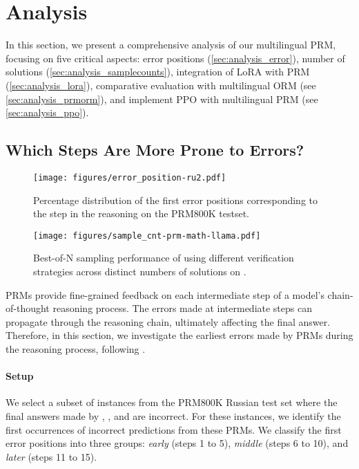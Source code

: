 \section{Analysis}
\label{sec:analysis}


In this section, we present a comprehensive analysis of our multilingual PRM, focusing on five critical aspects: error positions (\autoref{sec:analysis_error}), number of solutions (\autoref{sec:analysis_samplecounts}), integration of LoRA with PRM (\autoref{sec:analysis_lora}), comparative evaluation with multilingual ORM (see \autoref{sec:analysis_prmorm}), and implement PPO with multilingual PRM (see \autoref{sec:analysis_ppo}). 


\subsection{Which Steps Are More Prone to Errors?}
\label{sec:analysis_error}

\begin{figure}[t]
    \centering
    \texttt{[image: figures/error\_position-ru2.pdf]}
    \caption{Percentage distribution of the first error positions corresponding to the step in the reasoning on the PRM800K testset.}
    \label{fig:error_ru}
\end{figure}

\begin{figure}[t]
    \centering
    \texttt{[image: figures/sample\_cnt-prm-math-llama.pdf]}
    \caption{Best-of-N sampling performance of \llama using different verification strategies across distinct numbers of solutions on \mathset.}
    \label{fig:sample-numbers}
\end{figure}


PRMs provide fine-grained feedback on each intermediate step of a model's chain-of-thought reasoning process. The errors made at intermediate steps can propagate through the reasoning chain, ultimately affecting the final answer. Therefore, in this section, we investigate the earliest errors made by PRMs during the reasoning process, following \citet{processbench}.





\paragraph{Setup}
We select a subset of instances from the PRM800K Russian test set where the final answers made by \mono, \en, and \mix are incorrect. For these instances, we identify the first occurrences of incorrect predictions from these PRMs. 
We classify the first error positions into three groups: \textit{early} (steps 1 to 5), \textit{middle} (steps 6 to 10), and \textit{later} (steps 11 to 15).



